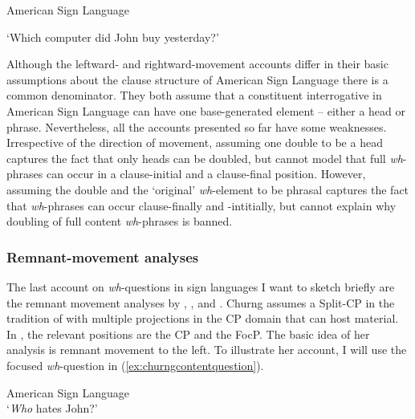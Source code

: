 \begin{exe}
\ex American Sign Language \citep[92]{aarons1994aspects} \\  

\glt `Which computer did John buy yesterday?' \label{ex:aarons1994whphrase} 
\end{exe}

\noindent Although the leftward- and rightward-movement accounts differ in their basic assumptions about the clause structure of American Sign Language there is a common denominator. They both assume that a constituent interrogative in American Sign Language can have one base-generated element -- either a head or phrase. Nevertheless, all the accounts presented so far have some weaknesses. Irrespective of the direction of movement, assuming one double to be a head captures the fact that only heads can be doubled, but cannot model that full \textit{wh}-phrases can occur in a clause-initial and a clause-final position. However, assuming the double and the `original' \textit{wh}-element to be phrasal captures the fact that \textit{wh}-phrases can occur clause-finally and -intitially, but cannot explain why doubling of full content \textit{wh}-phrases is banned. 

\subsubsection{Remnant-movement analyses}

The last account on \textit{wh}-questions in sign languages I want to sketch briefly are the remnant movement analyses by \citet{churng2006synchronizing, churng2007double, churng2009syntax}, \citet{sarac2007cross}, and \citet{aboh2010sa}. Churng assumes a Split-CP in the tradition of \citet{rizzi1997fine} with multiple projections in the CP domain that can host material. In \citet{churng2009syntax}, the relevant positions are the CP and the FocP. The basic idea of her analysis is remnant movement to the left. To illustrate her account, I will use the focused \textit{wh}-question in (\ref{ex:churngcontentquestion}).

\begin{exe}
\ex American Sign Language \citep[39]{churng2009syntax} \\ 
\glt `\textit{Who} hates John?' \label{ex:churngcontentquestion} 
\end{exe}

